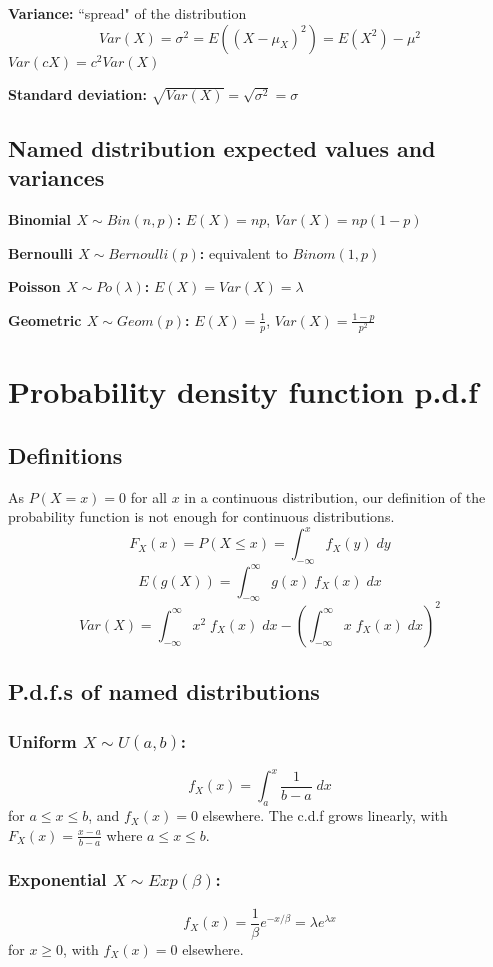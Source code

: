 \documentclass[15pt]{article}
\begin{document}
\textbf{Variance:} ``spread" of the distribution
\[
    Var(X) = \sigma^2 = E((X - \mu_X)^2) = E(X^2) - \mu^2
\]
$Var(cX) = c^2 Var(X)$

\textbf{Standard deviation:} $\sqrt{Var(X)} = \sqrt{\sigma^2} = \sigma$

\subsection{Named distribution expected values and variances}
\textbf{Binomial $X \sim Bin(n,p)$:} $E(X) = np$, $Var(X) = np(1-p)$

\textbf{Bernoulli $X \sim Bernoulli(p)$:} equivalent to $Binom(1,p)$

\textbf{Poisson $X \sim Po(\lambda)$:} $E(X) = Var(X) = \lambda$

\textbf{Geometric $X \sim Geom(p)$:} $E(X) = \frac{1}{p}$, $Var(X) = \frac{1-p}{p^2}$

\section{Probability density function p.d.f}
\subsection{Definitions}
As $P(X = x) = 0$ for all $x$ in a continuous distribution, our definition of the probability function is not enough for continuous distributions.
\[
    F_X (x) = P(X \leq x) = \int_{-\infty}^{x} f_X (y) \; dy
\]
\[
    E(g(X)) = \int_{-\infty}^{\infty} g(x) \; f_X (x) \; dx
\]
\[
    Var(X) = \int_{-\infty}^{\infty} x^2 \; f_X (x) \; dx - \left(\int_{-\infty}^{\infty} x \; f_X (x) \; dx \right)^2
\]
\subsection{P.d.f.s of named distributions}
\subsubsection{Uniform $X \sim U(a,b)$:}
\[
	f_X (x) = \int_a^x \frac{1}{b-a} \; dx   
\] for $a \leq x \leq b$, and $f_X (x) = 0$ elsewhere.
The c.d.f grows linearly, with $F_X (x) = \frac{x - a}{b-a}$ where $a \leq x \leq b$.

\subsubsection{Exponential $X \sim Exp(\beta)$:}
\[
    f_X (x) = \frac{1}{\beta} e^{-x / \beta} = \lambda e^{\lambda x}
\] for $x \geq 0$, with $f_X (x) = 0$ elsewhere.
\end{document}
